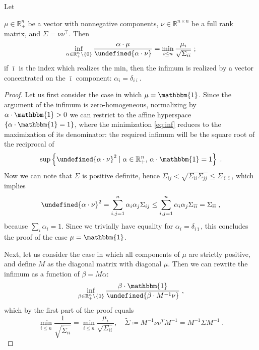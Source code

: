 \documentclass[runningheads]{m2ef}
\newcommand{\tr}[1]{{#1}^{\intercal}} %
\let\norm\undefined %
\DeclarePairedDelimiter\norm{\lVert}{\rVert}
\newcommand\soutpars[1]{\let\helpcmd\sout\parhelp#1\par\relax\relax}
\newcommand{\change}[1]{{\color{red} {#1}}}%
\newcommand{\remove}[1]{{\color{red} \soutpars{{#1}}}}%
\begin{document}
\begin{lemma}
	Let \remove{$\mu \in \mathbb{R}^n$} \change{$\mu \in \mathbb{R}^n_+$} be a vector with nonnegative components, $\nu \in \mathbb{R}^{n\times n}$ be a full rank matrix, and $\Sigma = \nu \tr{\nu}$. Then
	\begin{equation}\label{eq:inf}
		\inf_{\alpha \in \mathbb{R}_{+}^n \setminus \{0\}} \frac{\alpha \cdot \mu}{\norm{\alpha \cdot \nu}} = \min_{i\leq n} \frac{\mu_i}{\sqrt{\Sigma_{ii}}} \; ;
	\end{equation}
	if $\bar{\imath}$ is the index which realizes the min, then the infimum is realized by a vector concentrated on the $\bar{\imath}$ component: $\alpha_i = \delta_{i\bar{\imath}}$. 
\end{lemma}
\begin{proof}
	Let us first consider the case in which $\mu = \mathbbm{1}$. Since the argument of the infimum is zero-homogeneous, normalizing by $\alpha \cdot \mathbbm{1} > 0$ we can restrict to the affine hyperspace $\{\alpha \cdot \mathbbm{1} = 1\}$, where the minimization \eqref{eq:inf} reduces to the maximization of its denominator: the required infimum will be the square root of the reciprocal of
	\begin{equation}
	\sup\left\{\norm{\alpha \cdot \nu}^2 \mid \alpha \in \mathbb{R}_{+}^n,\, \alpha \cdot \mathbbm{1} = 1\right\} \; .
	\end{equation}
	Now we can note that $\Sigma$ is positive definite, hence $\Sigma_{ij} < \sqrt{\Sigma_{ii}\Sigma_{jj}} \leq \Sigma_{\bar{\imath}\bar{\imath}}$, which implies
	\begin{equation}
	\norm{\alpha \cdot \nu}^2 = \sum_{i,j=1}^{n} \alpha_i \alpha_j \Sigma_{ij} \leq \sum_{i,j=1}^{n} \alpha_i \alpha_j \Sigma_{\bar{\imath}\bar{\imath}} = \Sigma_{\bar{\imath}\bar{\imath}} \; ,
	\end{equation}
	because $\sum_i \alpha_i = 1$. Since we trivially have equality for $\alpha_i = \delta_{i\bar{\imath}}$, this concludes the proof of the case $\mu = \mathbbm{1}$.
	
	Next, let us consider the case in which all components of $\mu$ are strictly positive, and define $M$ as the diagonal matrix with diagonal $\mu$. Then we can rewrite the infimum as a function of $\beta = M\alpha$:
	\begin{equation}
	\inf_{\beta \in \mathbb{R}_{+}^n \setminus \{0\}} \frac{\beta \cdot \mathbbm{1}}{\norm{\beta \cdot M^{-1}\nu}} \; ,
	\end{equation}
	which by the first part of the proof equals 
	\begin{equation}
	\min_{i \leq n} \frac{1}{\sqrt{\tilde{\Sigma}_{ii}}} = \min_{i \leq n} \frac{\mu_i}{\sqrt{\Sigma_{ii}}}, \quad \tilde{\Sigma} \coloneqq M^{-1}\nu\nu^{T} M^{-1} = M^{-1}\Sigma M^{-1} \; .
	\end{equation}
	

\end{proof}
\end{document}

